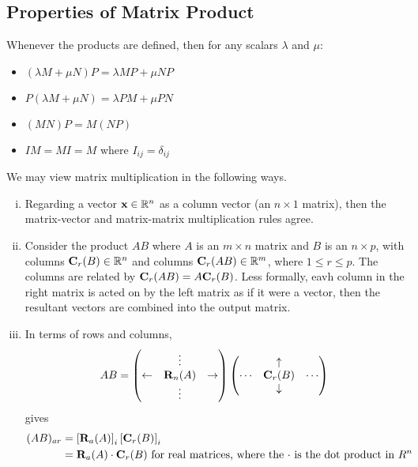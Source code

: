 \documentclass{article}
\begin{document}
\subsection{Properties of Matrix Product}
Whenever the products are defined, then for any scalars $\lambda$ and $\mu$:
\begin{itemize}
    \item $(\lambda M + \mu N)P = \lambda MP + \mu NP$
    \item $P(\lambda M + \mu N) = \lambda PM + \mu PN$
    \item $(MN)P = M(NP)$
    \item $IM = MI = M$ where $I_{ij} = \delta_{ij}$
\end{itemize}
We may view matrix multiplication in the following ways.
\begin{enumerate}[(i)]
    \item Regarding a vector $\vb x \in \mathbb R^n$ as a column vector (an $n \times 1$ matrix), then the matrix-vector and matrix-matrix multiplication rules agree.
    \item Consider the product $AB$ where $A$ is an $m \times n$ matrix and $B$ is an $n \times p$, with columns $\vb C_r(B) \in \mathbb R^n$ and columns $\vb C_r(AB) \in \mathbb R^m$, where $1 \leq r \leq p$. The columns are related by $\vb C_r(AB) = A \vb C_r(B)$. Less formally, eavh column in the right matrix is acted on by the left matrix as if it were a vector, then the resultant vectors are combined into the output matrix.
    \item In terms of rows and columns,
          \[ AB = \begin{pmatrix}
                             & \vdots     &             \\
                  \leftarrow & \vb R_n(A) & \rightarrow \\
                             & \vdots     &
              \end{pmatrix} \begin{pmatrix}
                         & \uparrow   &        \\
                  \cdots & \vb C_r(B) & \cdots \\
                         & \downarrow &
              \end{pmatrix} \]
          gives
          \begin{align*}
              (AB)_{ar} & = \left[ \vb R_a(A) \right]_i \left[ \vb C_r(B) \right]_i                                              \\
                        & = \vb R_a(A) \cdot \vb C_r(B) \text{ for real matrices, where the $\cdot$ is the dot product in $R^n$}
          \end{align*}
\end{enumerate}
\end{document}
